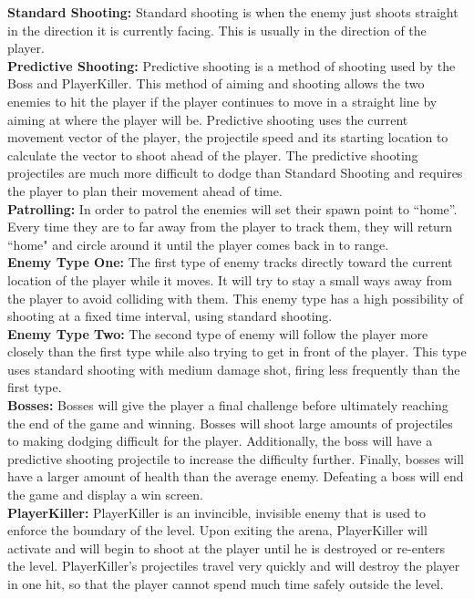 \documentclass[12pt]{article}       %
\begin{document}
	{\bf Standard Shooting:} Standard shooting is when the enemy just shoots straight in the direction it is currently facing.  This is usually in the direction of the player. \\

	{\bf Predictive Shooting:} Predictive shooting is a method of shooting used by the Boss and PlayerKiller. This method of aiming and shooting allows the two enemies to hit the player if the player continues to move in a straight line by aiming at where the player will be. Predictive shooting uses the current movement vector of the player, the projectile speed and its starting location to calculate the vector to shoot ahead of the player. The predictive shooting projectiles are much more difficult to dodge than Standard Shooting and requires the player to plan their movement ahead of time. \\

	{\bf Patrolling:} In order to patrol the enemies will set their spawn point to ``home''. Every time they are to far away from the player to track them, they will return ``home" and circle around it until the player comes back in to range. \\

	{\bf Enemy Type One:} The first type of enemy tracks directly toward the current location of the player while it moves. It will try to stay a small ways away from the player to avoid colliding with them. This enemy type has a high possibility of shooting at a fixed time interval, using standard shooting. \\

	{\bf Enemy Type Two:} The second type of enemy will follow the player more closely than the first type while also trying to get in front of the player. This type uses standard shooting with medium damage shot, firing less frequently than the first type. \\

	{\bf Bosses:} Bosses will give the player a final challenge before ultimately reaching the end of the game and winning. Bosses will shoot large amounts of projectiles to making dodging difficult for the player. Additionally, the boss will have a predictive shooting projectile to increase the difficulty further. Finally, bosses will have a larger amount of health than the average enemy. Defeating a boss will end the game and display a win screen. \\

	{\bf PlayerKiller:} PlayerKiller is an invincible, invisible enemy that is used to enforce the boundary of the level. Upon exiting the arena, PlayerKiller will activate and will begin to shoot at the player until he is destroyed or re-enters the level. PlayerKiller's projectiles travel very quickly and will destroy the player in one hit, so that the player cannot spend much time safely outside the level.
\end{document}
